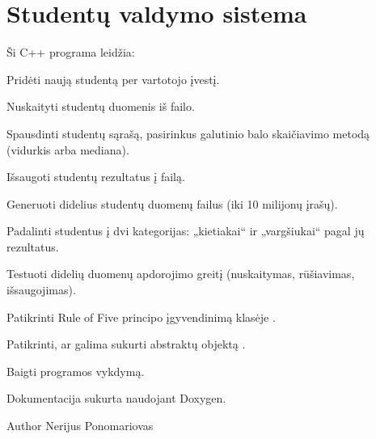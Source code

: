 \chapter{Studentų valdymo sistema}
\hypertarget{index}{}\label{index}
Ši C++ programa leidžia\+:


\begin{DoxyEnumerate}
\item Pridėti naują studentą per vartotojo įvestį.
\item Nuskaityti studentų duomenis iš failo.
\item Spausdinti studentų sąrašą, pasirinkus galutinio balo skaičiavimo metodą (vidurkis arba mediana).
\item Išsaugoti studentų rezultatus į failą.
\item Generuoti didelius studentų duomenų failus (iki 10 milijonų įrašų).
\item Padalinti studentus į dvi kategorijas\+: „kietiakai“ ir „vargšiukai“ pagal jų rezultatus.
\item Testuoti didelių duomenų apdorojimo greitį (nuskaitymas, rūšiavimas, išsaugojimas).
\item Patikrinti Rule of Five principo įgyvendinimą klasėje .
\item Patikrinti, ar galima sukurti abstraktų objektą .
\item Baigti programos vykdymą.
\end{DoxyEnumerate}

Dokumentacija sukurta naudojant Doxygen.

\begin{DoxyAuthor}{Author}
Nerijus Ponomariovas 
\end{DoxyAuthor}
